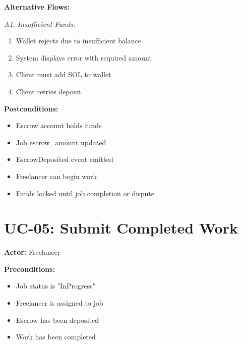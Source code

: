 \documentclass[a4paper,13pt,twoside]{report}
\theoremstyle{definition}
\begin{document}
\textbf{Alternative Flows:}

\textit{A1. Insufficient Funds:}
\begin{enumerate}
    \item Wallet rejects due to insufficient balance
    \item System displays error with required amount
    \item Client must add SOL to wallet
    \item Client retries deposit
\end{enumerate}

\textbf{Postconditions:}
\begin{itemize}
    \item Escrow account holds funds
    \item Job escrow\_amount updated
    \item EscrowDeposited event emitted
    \item Freelancer can begin work
    \item Funds locked until job completion or dispute
\end{itemize}

\section{UC-05: Submit Completed Work}

\textbf{Actor:} Freelancer

\textbf{Preconditions:}
\begin{itemize}
    \item Job status is "InProgress"
    \item Freelancer is assigned to job
    \item Escrow has been deposited
    \item Work has been completed
\end{itemize}
\end{document}
